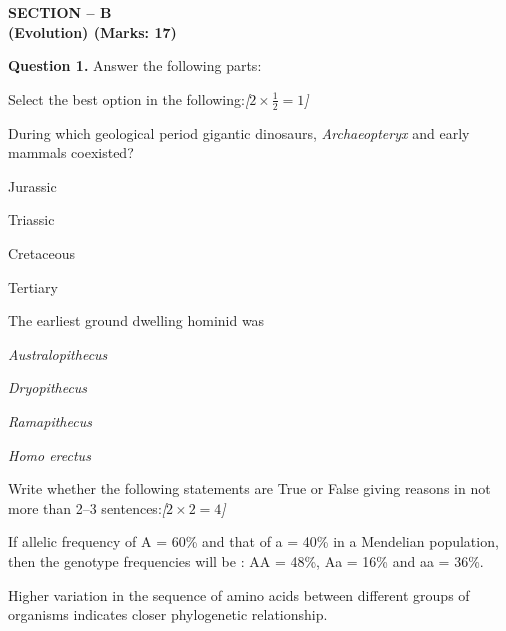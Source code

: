 \documentclass[11pt,a4paper]{article}
\newcommand{\pts}[1]{\hfill   \textit{[#1]}}
\begin{document}
\pagebreak

\begin{center}
   \textbf{SECTION -- B} \\
   \textbf{(Evolution) (Marks: 17)}
\end{center}

\medskip


\noindent   \textbf{Question 1.} Answer the following parts:

\begin{parts}
  \item Select the best option in the following:\pts{$2  \times \frac{1}{2} = 1$}
  
\begin{parts}
    \item During which geological period gigantic dinosaurs,   \textit{Archaeopteryx} and early mammals coexisted?
    
\begin{parts}
      \item Jurassic
      \item Triassic
      \item Cretaceous
      \item Tertiary
    \end{parts}
    
    \item The earliest ground dwelling hominid was
    
\begin{parts}
      \item   \textit{Australopithecus}
      \item   \textit{Dryopithecus}
      \item   \textit{Ramapithecus}
      \item   \textit{Homo erectus}
    \end{parts}
  \end{parts}
  
  \item Write whether the following statements are True or False giving reasons in not more than 2--3 sentences:\pts{$2  \times 2 = 4$}
  
\begin{parts}
    \item If allelic frequency of A = 60\% and that of a = 40\% in a Mendelian population, then the genotype frequencies will be : AA = 48\%, Aa = 16\% and aa = 36\%.
    \item Higher variation in the sequence of amino acids between different groups of organisms indicates closer phylogenetic relationship.
  \end{parts}
\end{parts}
\end{document}
